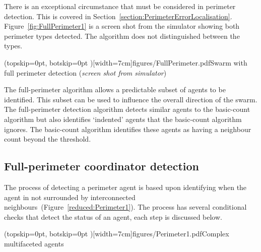 \documentclass{ieeeaccess}
\begin{document}
There is an exceptional circumstance that must be considered in perimeter detection. This is covered in Section~\ref{section:PerimeterErrorLocalisation}. Figure~\ref{fig:FullPerimeter1} is a screen shot from the simulator showing both perimeter types detected. The algorithm does not distinguished between the types. 


\Figure[t!](topskip=0pt, botskip=0pt )[width=7cm]{figures/FullPerimeter.pdf}{Swarm with full perimeter detection (\textit{screen shot from simulator})\label{fig:FullPerimeter1}}

The full-perimeter algorithm allows a predictable subset of agents to be identified. This subset can be used to influence the overall direction of the swarm. The full-perimeter detection algorithm detects similar agents to the basic-count algorithm but also identifies `indented' agents that the basic-count algorithm ignores. The basic-count algorithm identifies these agents as having a neighbour count beyond the threshold.

\subsection{Full-perimeter coordinator detection}\label{sec:PerimeterAgentDetection} 
The process of detecting a perimeter agent is based upon identifying when the agent in not surrounded by interconnected neighbours~(Figure~\ref{reduced:Perimeter1}). The process has several conditional checks that detect the status of an agent, each step is discussed below. 


\Figure[t!](topskip=0pt, botskip=0pt )[width=7cm]{figures/Perimeter1.pdf}{Complex multifaceted agents\label{reduced:Perimeter1}}
\end{document}

